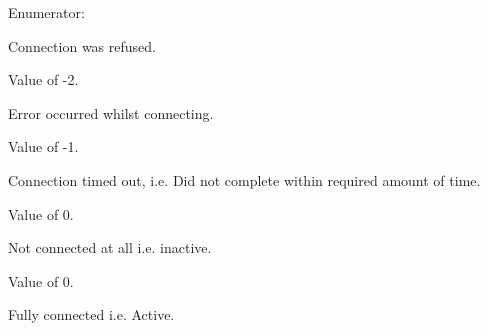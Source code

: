 \begin{Desc}
\item[Enumerator: ]\par
\begin{description}
\item[{\em 
\hypertarget{class_net_utility_a7eae52138f8bd597ffc67ebf07e86b6dabc894c2de7a4404e353f3bcc1193e90b}{
REFUSED}
\label{class_net_utility_a7eae52138f8bd597ffc67ebf07e86b6dabc894c2de7a4404e353f3bcc1193e90b}
}]Connection was refused. \par
 Value of -\/2. \item[{\em 
\hypertarget{class_net_utility_a7eae52138f8bd597ffc67ebf07e86b6da7c6b34544a99c4c264366f2fed4f0973}{
CONNECTION\_\-ERROR}
\label{class_net_utility_a7eae52138f8bd597ffc67ebf07e86b6da7c6b34544a99c4c264366f2fed4f0973}
}]Error occurred whilst connecting. \par
 Value of -\/1. \item[{\em 
\hypertarget{class_net_utility_a7eae52138f8bd597ffc67ebf07e86b6da319e02f6059b4b08edd70c16fa5206fd}{
TIMED\_\-OUT}
\label{class_net_utility_a7eae52138f8bd597ffc67ebf07e86b6da319e02f6059b4b08edd70c16fa5206fd}
}]Connection timed out, i.e. Did not complete within required amount of time. \par
 Value of 0. \item[{\em 
\hypertarget{class_net_utility_a7eae52138f8bd597ffc67ebf07e86b6daef8b7210b8ae3961e19fcde743ee08af}{
NOT\_\-CONNECTED}
\label{class_net_utility_a7eae52138f8bd597ffc67ebf07e86b6daef8b7210b8ae3961e19fcde743ee08af}
}]Not connected at all i.e. inactive.\par
 Value of 0. \item[{\em 
\hypertarget{class_net_utility_a7eae52138f8bd597ffc67ebf07e86b6da9c07ac24fb9bdd4157ace978968721fd}{
CONNECTED}
\label{class_net_utility_a7eae52138f8bd597ffc67ebf07e86b6da9c07ac24fb9bdd4157ace978968721fd}
}]Fully connected i.e. Active. \par

\end{description}
\end{Desc}
